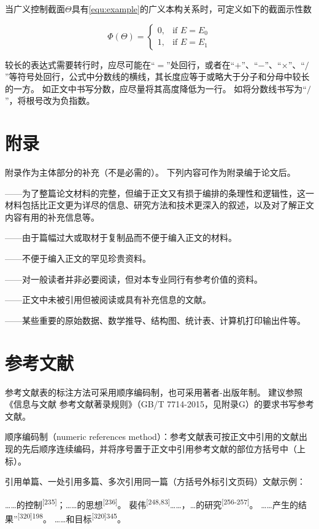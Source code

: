 当广义控制截面$\Theta$具有\ref{equ:example}的广义本构关系时，可定义如下的截面示性数

\begin{equation}
    \Phi\left(\Theta\right) =
    \begin{cases}
        0, & \text{if } E = E_{0} \\
        1, & \text{if } E = E_{1}
    \end{cases}
    \label{equ:example}
\end{equation}

较长的表达式需要转行时，应尽可能在“$=$”处回行，或者在“$+$”、“$-$”、“$\times$”、“$/$”等符号处回行，公式中分数线的横线，其长度应等于或略大于分子和分母中较长的一方。
如正文中书写分数，应尽量将其高度降低为一行。
如将分数线书写为“$/$”，将根号改为负指数。

\section{附录}

附录作为主体部分的补充（不是必需的）。
下列内容可作为附录编于论文后。

——为了整篇论文材料的完整，但编于正文又有损于编排的条理性和逻辑性，这一材料包括比正文更为详尽的信息、研究方法和技术更深入的叙述，以及对了解正文内容有用的补充信息等。

——由于篇幅过大或取材于复制品而不便于编入正文的材料。

——不便于编入正文的罕见珍贵资料。

——对一般读者并非必要阅读，但对本专业同行有参考价值的资料。

——正文中未被引用但被阅读或具有补充信息的文献。

——某些重要的原始数据、数学推导、结构图、统计表、计算机打印输出件等。

\section{参考文献}

参考文献表的标注方法可采用顺序编码制，也可采用著者-出版年制。
建议参照《信息与文献 参考文献著录规则》（GB/T 7714-2015，见附录G）的要求书写参考文献。

顺序编码制（numeric references method）：参考文献表可按正文中引用的文献出现的先后顺序连续编码，并将序号置于正文中引用参考文献的部位方括号中（上标）。

引用单篇、一处引用多篇、多次引用同一篇（方括号外标引文页码）文献示例：

……的控制\textsuperscript{[235]}；……的思想\textsuperscript{[236]}。
裴伟\textsuperscript{[248,83]}……，…的研究\textsuperscript{[256-257]}。
……产生的结果”\textsuperscript{[320]198}。
……和目标\textsuperscript{[320]345}。

